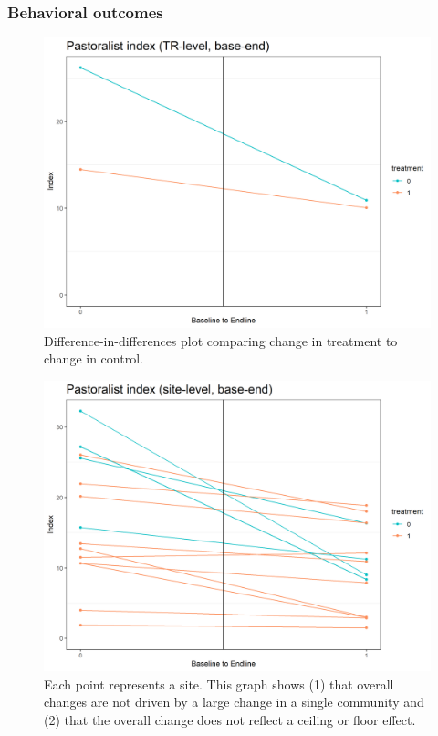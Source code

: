\documentclass[
]{article}
\begin{document}
\hypertarget{behavioral-outcomes}{%
\subsubsection{Behavioral outcomes}\label{behavioral-outcomes}}

\begin{figure}[H]
\centering
\includegraphics[width=\linewidth]{../data_and_code/obs_dat/b_analysis/market_pasts_TrTime.plot.png}
\caption{Difference-in-differences plot comparing change in treatment to change in control.}\label{fig:market_past_TrTime}
\end{figure}

\begin{figure}[H]
\centering
\includegraphics[width=\linewidth]{../data_and_code/obs_dat/b_analysis/market_pasts_siteTime.plot.png}
\caption{Each point represents a site. This graph shows (1) that overall changes are not driven by a large change in a single community and (2) that the overall change does not reflect a ceiling or floor effect.}\label{fig:market_past_siteTime}
\end{figure}
\end{document}
